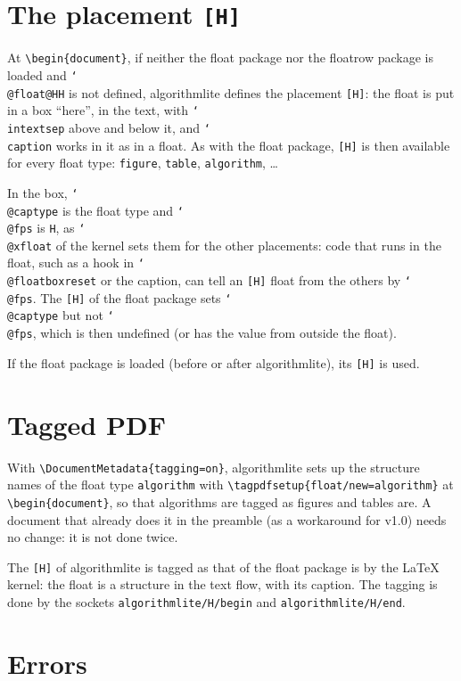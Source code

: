 \documentclass{article}
\newcommand*\cs[1]{\texttt{\char`\\#1}}
\newcommand*\pkg[1]{\textsf{#1}}
\newcommand*\env[1]{\texttt{#1}}
\begin{document}
\section{The placement \texttt{[H]}}

At \verb|\begin{document}|, if neither the \pkg{float} package nor the
\pkg{floatrow} package is loaded and \cs{@float@HH} is not defined,
\pkg{algorithmlite} defines the placement \texttt{[H]}: the float is
put in a box ``here'', in the text, with \cs{intextsep} above and
below it, and \cs{caption} works in it as in a float.  As with the
\pkg{float} package, \texttt{[H]} is then available for every float
type: \env{figure}, \env{table}, \env{algorithm}, \dots

In the box, \cs{@captype} is the float type and \cs{@fps} is
\texttt{H}, as \cs{@xfloat} of the kernel sets them for the other
placements: code that runs in the float, such as a hook in
\cs{@floatboxreset} or the caption, can tell an \texttt{[H]} float from
the others by \cs{@fps}.  The \texttt{[H]} of the \pkg{float} package
sets \cs{@captype} but not \cs{@fps}, which is then undefined (or has
the value from outside the float).

If the \pkg{float} package is loaded (before or after
\pkg{algorithmlite}), its \texttt{[H]} is used.

\section{Tagged PDF}

With \verb|\DocumentMetadata{tagging=on}|, \pkg{algorithmlite} sets up
the structure names of the float type \texttt{algorithm} with
\verb|\tagpdfsetup{float/new=algorithm}| at \verb|\begin{document}|,
so that algorithms are tagged as figures and tables are.  A document
that already does it in the preamble (as a workaround for v1.0) needs
no change: it is not done twice.

The \texttt{[H]} of \pkg{algorithmlite} is tagged as that of the
\pkg{float} package is by the \LaTeX{} kernel: the float is a
structure in the text flow, with its caption.  The tagging is done by
the sockets \texttt{algorithmlite/H/begin} and
\texttt{algorithmlite/H/end}.

\section{Errors}
\end{document}
